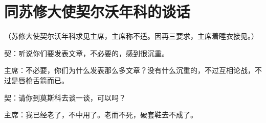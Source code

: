 \section[同苏修大使契尔沃年科的谈话（一九六三年二月二十三日）]{同苏修大使契尔沃年科的谈话}


（苏修大使契尔沃年科求见主席，主席称不适。因再三要求，主席着睡衣接见。）

契：听说你们要发表文章，不必要的，感到很沉重。

主席：不必要，你们为什么发表那么多文章？没有什么沉重的，不过互相论战，不过是唇枪舌箭而已。

契：请你到莫斯科去谈一谈，可以吗？

主席：我已经老了，不中用了。老而不死，破套鞋去不成了。

